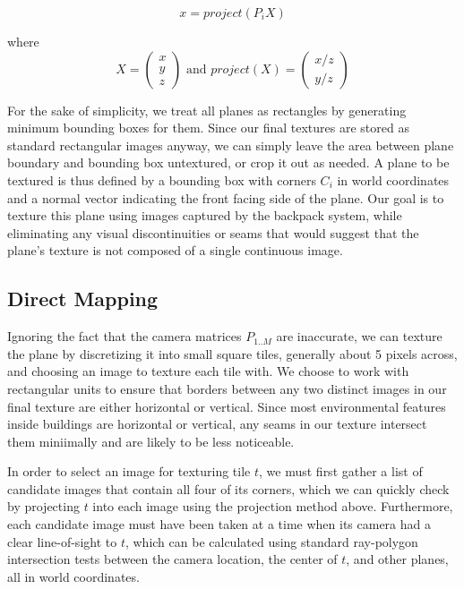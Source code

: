 \documentclass[10pt,twocolumn,letterpaper]{article}
\begin{document}
\[
x=project(P_iX)
\]

where
\[X = \begin{pmatrix} x \\ y \\ z \end{pmatrix} \textrm{ and }
project(X) = \begin{pmatrix} x/z \\ y/z \end{pmatrix}
\]

For the sake of simplicity, we treat all planes as rectangles by
generating minimum bounding boxes for them. Since our final textures
are stored as standard rectangular images anyway, we can simply leave
the area between plane boundary and bounding box untextured, or crop
it out as needed. A plane to be textured is thus defined by a bounding
box with corners $C_i$ in world coordinates and a normal vector
indicating the front facing side of the plane. Our goal is to texture
this plane using images captured by the backpack system, while
eliminating any visual discontinuities or seams that would suggest
that the plane's texture is not composed of a single continuous image.

\subsection{Direct Mapping}
\label{sec:directMapping}

Ignoring the fact that the camera matrices $P_{1..M}$ are inaccurate,
we can texture the plane by discretizing it into small square tiles,
generally about 5 pixels across, and choosing an image to texture each
tile with. We choose to work with rectangular units to ensure that
borders between any two distinct images in our final texture are
either horizontal or vertical. Since most environmental features
inside buildings are horizontal or vertical, any seams in our texture
intersect them miniimally and are likely to be less noticeable.

In order to select an image for texturing tile $t$, we must first
gather a list of candidate images that contain all four of its
corners, which we can quickly check by projecting $t$ into each image
using the projection method above. Furthermore, each candidate image
must have been taken at a time when its camera had a clear
line-of-sight to $t$, which can be calculated using standard
ray-polygon intersection tests between the camera location, the center
of $t$, and other planes, all in world coordinates.
\end{document}
